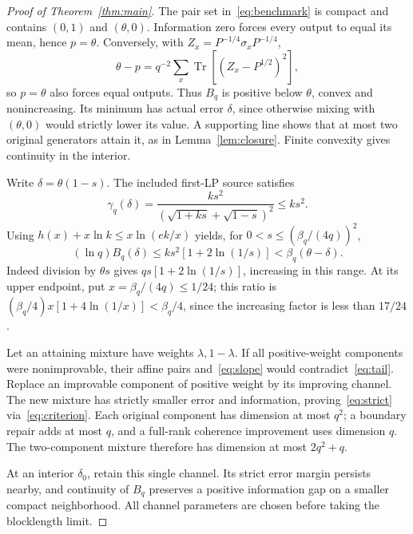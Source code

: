 \documentclass[12pt,letterpaper,onecolumn]{article}
\theoremstyle{definition}
\theoremstyle{remark}
\DeclareMathOperator{\Tr}{Tr}
\begin{document}
\begin{proof}[Proof of Theorem~\ref{thm:main}]
The pair set in~\eqref{eq:benchmark} is compact and contains \((0,1)\) and \((\theta,0)\). Information zero forces every output to equal its mean, hence \(p=\theta\). Conversely, with \(Z_x=P^{-1/4}\sigma_xP^{-1/4}\),
\[
\theta-p=q^{-2}\sum_x\Tr[(Z_x-P^{1/2})^2],
\]
so \(p=\theta\) also forces equal outputs. Thus \(B_q\) is positive below \(\theta\), convex and nonincreasing. Its minimum has actual error \(\delta\), since otherwise mixing with \((\theta,0)\) would strictly lower its value. A supporting line shows that at most two original generators attain it, as in Lemma~\ref{lem:closure}. Finite convexity gives continuity in the interior.

Write \(\delta=\theta(1-s)\). The included first-LP source satisfies
\[
\gamma_q(\delta)=\frac{ks^2}{(\sqrt{1+ks}+\sqrt{1-s})^2}\le ks^2.
\]
Using \(h(x)+x\ln k\le x\ln(ek/x)\) yields, for
\(0<s\le(\beta_q/(4q))^2\),
\begin{equation}\label{eq:tail}
(\ln q)B_q(\delta)\le ks^2[1+2\ln(1/s)]
<\beta_q(\theta-\delta).
\end{equation}
Indeed division by \(\theta s\) gives \(qs[1+2\ln(1/s)]\), increasing in this range. At its upper endpoint, put \(x=\beta_q/(4q)\le1/24\); this ratio is
\((\beta_q/4)x[1+4\ln(1/x)]<\beta_q/4\), since the increasing factor is less than \(17/24\).

Let an attaining mixture have weights \(\lambda,1-\lambda\). If all positive-weight components were nonimprovable, their affine pairs and~\eqref{eq:slope} would contradict~\eqref{eq:tail}. Replace an improvable component of positive weight by its improving channel. The new mixture has strictly smaller error and information, proving~\eqref{eq:strict} via~\eqref{eq:criterion}.
Each original component has dimension at most \(q^2\); a boundary repair adds at most \(q\), and a full-rank coherence improvement uses dimension \(q\). The two-component mixture therefore has dimension at most \(2q^2+q\).

At an interior \(\delta_0\), retain this single channel. Its strict error margin persists nearby, and continuity of \(B_q\) preserves a positive information gap on a smaller compact neighborhood. All channel parameters are chosen before taking the blocklength limit.
\end{proof}
\end{document}
